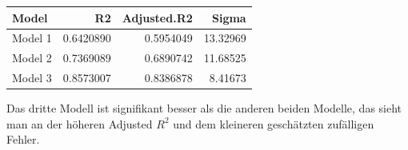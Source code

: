 \documentclass[]{article}
\begin{document}
\begin{tabular}{l|r|r|r}
\hline
Model & R2 & Adjusted.R2 & Sigma\\
\hline
Model 1 & 0.6420890 & 0.5954049 & 13.32969\\
\hline
Model 2 & 0.7369089 & 0.6890742 & 11.68525\\
\hline
Model 3 & 0.8573007 & 0.8386878 & 8.41673\\
\hline
\end{tabular}

Das dritte Modell ist signifikant besser als die anderen beiden Modelle, das sieht man an der höheren Adjusted \(R^2\)
und dem kleineren geschätzten zufälligen Fehler.


\end{document}
